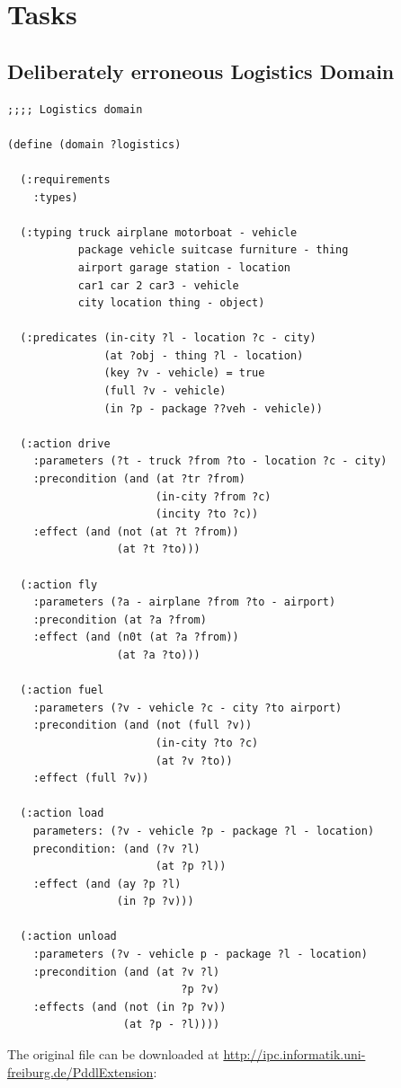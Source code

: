 \documentclass[runningheads]{llncs}
\begin{document}
\appendix

\section{Tasks}
\label{sub:tasks}
\subsection{Deliberately erroneous Logistics Domain}
\label{logistics}
\begin{verbatim}
;;;; Logistics domain

(define (domain ?logistics)

  (:requirements
    :types) 

  (:typing truck airplane motorboat - vehicle
           package vehicle suitcase furniture - thing
           airport garage station - location
           car1 car 2 car3 - vehicle
           city location thing - object)

  (:predicates (in-city ?l - location ?c - city)
               (at ?obj - thing ?l - location)
               (key ?v - vehicle) = true
               (full ?v - vehicle)
               (in ?p - package ??veh - vehicle))

  (:action drive
    :parameters (?t - truck ?from ?to - location ?c - city)
    :precondition (and (at ?tr ?from)
                       (in-city ?from ?c)
                       (incity ?to ?c))
    :effect (and (not (at ?t ?from))
                 (at ?t ?to)))

  (:action fly
    :parameters (?a - airplane ?from ?to - airport)
    :precondition (at ?a ?from)
    :effect (and (n0t (at ?a ?from))
                 (at ?a ?to)))

  (:action fuel
    :parameters (?v - vehicle ?c - city ?to airport)
    :precondition (and (not (full ?v))
                       (in-city ?to ?c)
                       (at ?v ?to))
    :effect (full ?v))                   

  (:action load
    parameters: (?v - vehicle ?p - package ?l - location)
    precondition: (and (?v ?l)
                       (at ?p ?l))
    :effect (and (ay ?p ?l)
                 (in ?p ?v)))

  (:action unload
    :parameters (?v - vehicle p - package ?l - location)
    :precondition (and (at ?v ?l)
                           ?p ?v)
    :effects (and (not (in ?p ?v))
                  (at ?p - ?l))))
                \end{verbatim}
The original file can be downloaded at
\url{http://ipc.informatik.uni-freiburg.de/PddlExtension}:
\end{document}
